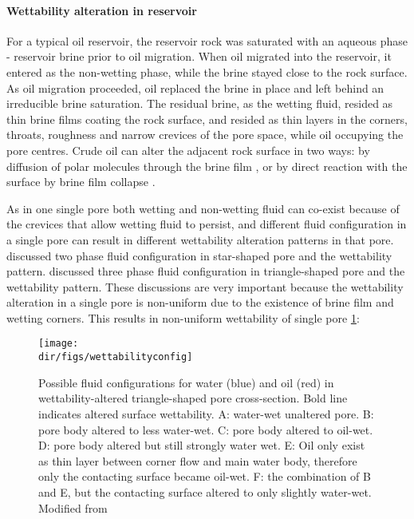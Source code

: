 \paragraph{Wettability alteration in reservoir}
For a typical oil reservoir, the reservoir rock was saturated with an aqueous phase - reservoir brine prior to oil migration. When oil migrated into the reservoir, it entered as the non-wetting phase, while the brine stayed close to the rock surface. As oil migration proceeded, oil replaced the brine in place and left behind an irreducible brine saturation. The residual brine, as the wetting fluid, resided as thin brine films coating the rock surface, and resided as thin layers in the corners, throats, roughness and narrow crevices of the pore space, while oil occupying the pore centres. Crude oil can alter the adjacent rock surface in two ways: by diffusion of polar molecules through the brine film \citep{cuiec1984rock,anderson1986wettability}, or by direct reaction with the surface by brine film collapse \citep{hirasaki1991wettability,buckley1996mechanisms}.

As in one single pore both wetting and non-wetting fluid can co-exist because of the crevices that allow wetting fluid to persist, and different fluid configuration in a single pore can result in different wettability alteration patterns in that pore. \citet{kovscek1993pore} discussed two phase fluid configuration in star-shaped pore and the wettability pattern. \citet{hui2000effects} discussed three phase fluid configuration in triangle-shaped pore and the wettability pattern. These discussions are very important because the wettability alteration in a single pore is non-uniform due to the existence of brine film and wetting corners. This results in non-uniform wettability of single pore \ref{wetconfig}:

\begin{figure}[htbp]
  \centering
  \texttt{[image: \\dir/figs/wettabilityconfig]}
  \caption{Possible fluid configurations for water (blue) and oil (red) in wettability-altered triangle-shaped pore cross-section. Bold line indicates altered surface wettability. A: water-wet unaltered pore. B: pore body altered to less water-wet. C: pore body altered to oil-wet. D: pore body altered but still strongly water wet. E: Oil only exist as thin layer between corner flow and main water body, therefore only the contacting surface became oil-wet. F: the combination of B and E, but the contacting surface altered to only slightly water-wet. Modified from \citet{helland2006physically}}
  \label{wetconfig}
\end{figure}

